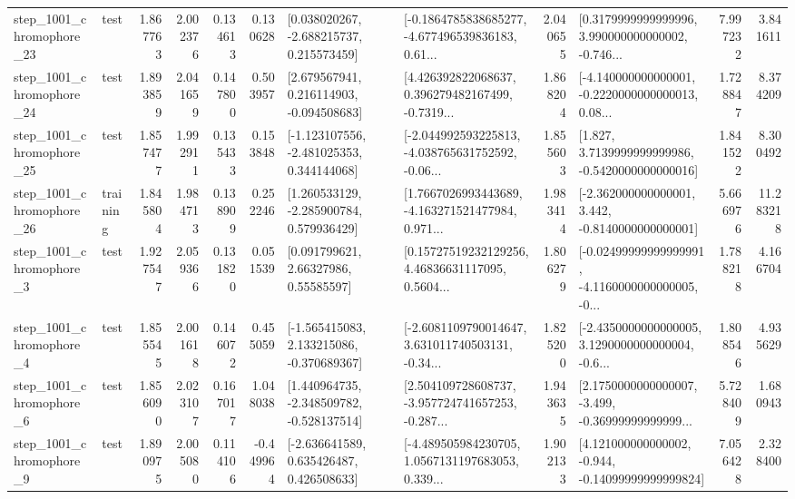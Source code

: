 \begin{tabular}{llrrrrllrlrr}
 step\_1001\_chromophore\_23 &      test &      1.867763 &    2.002376 &      0.134613 &  0.130628 &    [0.038020267, -2.688215737, 0.215573459] &  [-0.1864785838685277, -4.677496539836183, 0.61... &       2.040655 &  [0.3179999999999996, 3.990000000000002, -0.746... &            7.997232 &          3.841611 \\
 step\_1001\_chromophore\_24 &      test &      1.893859 &    2.041659 &      0.147800 &  0.503957 &    [2.679567941, 0.216114903, -0.094508683] &  [4.426392822068637, 0.396279482167499, -0.7319... &       1.868204 &  [-4.140000000000001, -0.2220000000000013, 0.08... &            1.728847 &          8.374209 \\
 step\_1001\_chromophore\_25 &      test &      1.857477 &    1.992911 &      0.135433 &  0.153848 &   [-1.123107556, -2.481025353, 0.344144068] &  [-2.044992593225813, -4.038765631752592, -0.06... &       1.855603 &   [1.827, 3.7139999999999986, -0.5420000000000016] &            1.841522 &          8.300492 \\
 step\_1001\_chromophore\_26 &  training &      1.845804 &    1.984713 &      0.138909 &  0.252246 &    [1.260533129, -2.285900784, 0.579936429] &  [1.7667026993443689, -4.163271521477984, 0.971... &       1.983414 &   [-2.362000000000001, 3.442, -0.8140000000000001] &            5.666976 &         11.283218 \\
  step\_1001\_chromophore\_3 &      test &      1.927547 &    2.059366 &      0.131820 &  0.051539 &       [0.091799621, 2.66327986, 0.55585597] &  [0.15727519232129256, 4.46836631117095, 0.5604... &       1.806279 &  [-0.02499999999999991, -4.1160000000000005, -0... &            1.788218 &          4.166704 \\
  step\_1001\_chromophore\_4 &      test &      1.855545 &    2.001618 &      0.146072 &  0.455059 &   [-1.565415083, 2.133215086, -0.370689367] &  [-2.6081109790014647, 3.631011740503131, -0.34... &       1.825200 &  [-2.4350000000000005, 3.1290000000000004, -0.6... &            1.808546 &          4.935629 \\
  step\_1001\_chromophore\_6 &      test &      1.856090 &    2.023107 &      0.167017 &  1.048038 &   [1.440964735, -2.348509782, -0.528137514] &  [2.504109728608737, -3.957724741657253, -0.287... &       1.943635 &  [2.1750000000000007, -3.499, -0.36999999999999... &            5.728409 &          1.680943 \\
  step\_1001\_chromophore\_9 &      test &      1.890975 &    2.005080 &      0.114106 & -0.449964 &    [-2.636641589, 0.635426487, 0.426508633] &  [-4.489505984230705, 1.0567131197683053, 0.339... &       1.902133 &  [4.121000000000002, -0.944, -0.14099999999999824] &            7.056428 &          2.328400 \\

\end{tabular}
